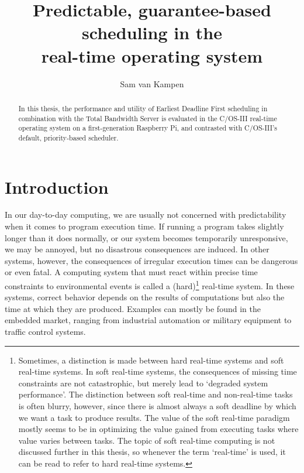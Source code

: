 \documentclass[twoside]{uva-inf-bachelor-thesis}
\title{Predictable, guarantee-based\\ scheduling in the \ucosiii\\ real-time operating system}
\author{Sam van Kampen}
\newcommand{\ucosiii}{\textmu C/OS-III\xspace}
\begin{document}
\maketitle

\begin{abstract}
    In this thesis, the performance and utility of Earliest Deadline First scheduling in combination with the Total Bandwidth Server is evaluated  in the \ucosiii real-time operating system on a first-generation Raspberry Pi, and contrasted with \ucosiii's default, priority-based scheduler.
\end{abstract}


\tableofcontents

%
%
%
%

\chapter{Introduction}
In our day-to-day computing, we are usually not concerned with predictability when it comes to program execution time. If running a program takes slightly longer than it does normally, or our system becomes temporarily unresponsive, we may be annoyed, but no disastrous consequences are induced. In other systems, however, the consequences of irregular execution times can be dangerous or even fatal. A computing system that must react within precise time constraints to environmental events is called a (hard)\footnote{Sometimes, a distinction is made between hard real-time systems and soft real-time systems. In soft real-time systems, the consequences of missing time constraints are not catastrophic, but merely lead to `degraded system performance'. The distinction between soft real-time and non-real-time tasks is often blurry, however, since there is almost always a soft deadline by which we want a task to produce results. The value of the soft real-time paradigm mostly seems to be in optimizing the value gained from executing tasks where value varies between tasks. The topic of soft real-time computing is not discussed further in this thesis, so whenever the term `real-time' is used, it can be read to refer to hard real-time systems.} real-time system\cite{buttazzo2011hard}. In these systems, correct behavior depends on the results of computations but also the time at which they are produced. Examples can mostly be found in the embedded market, ranging from industrial automation or military equipment to traffic control systems.
\end{document}
